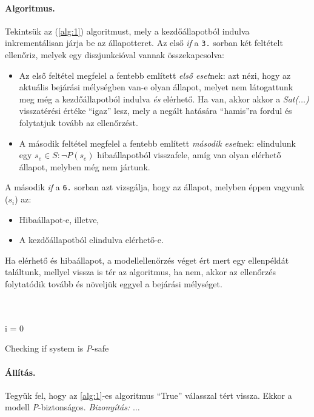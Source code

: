\paragraph{Algoritmus.}
Tekintsük az (\ref{alg:1}) algoritmust, mely a kezdőállapotból indulva inkrementálisan járja be az állapotteret. Az első \emph{if} a \verb+3.+ sorban két feltételt ellenőriz, melyek egy diszjunkcióval vannak összekapcsolva:
\begin{itemize}
	\item Az első feltétel megfelel a fentebb említett \emph{első eset}nek: azt nézi, hogy az aktuális bejárási mélységben van-e olyan állapot, melyet nem látogattunk meg még a kezdőállapotból indulva \emph{és} elérhető. Ha van, akkor akkor a \emph{Sat($\ldots$)} visszatérési értéke ``igaz'' lesz, mely a negált hatására ``hamis''ra fordul és folytatjuk tovább az ellenőrzést.
	
	\item A második feltétel megfelel a fentebb említett \emph{második eset}nek: elindulunk egy  $s_e \in S : \neg P(s_e)$ hibaállapotból visszafele, amíg van olyan elérhető állapot, melyben még nem jártunk.
\end{itemize}
A második \emph{if} a \verb+6.+ sorban azt vizsgálja, hogy az állapot, melyben éppen vagyunk ($s_i$) az:
\begin{itemize}
	\item Hibaállapot-e, illetve,
	\item A kezdőállapotból elindulva elérhető-e.
\end{itemize}
Ha elérhető és hibaállapot, a modellellenőrzés véget ért mert egy ellenpéldát találtunk, mellyel vissza is tér az algoritmus, ha nem, akkor az ellenőrzés folytatódik tovább és növeljük eggyel a bejárási mélységet.
\ \\
\ \\
\ \\
\begin{algorithm}[H]
\label{alg:1}

\SetAlgoLined
i = 0 \\
\caption{Checking if system is \emph{P}-safe}
\end{algorithm}

\paragraph{Állítás.} Tegyük fel, hogy az \ref{alg:1}-es algoritmus ``True'' válasszal tért vissza. Ekkor a modell \emph{P}-biztonságos.
\newline
\newline
\emph{Bizonyítás:} $\ldots$




















